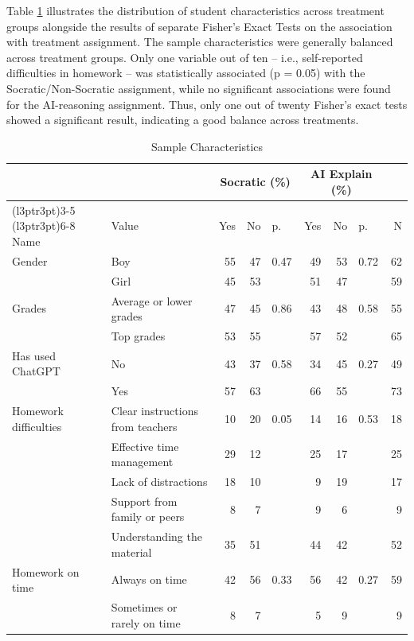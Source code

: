 \documentclass[
  11pt,
]{article}
\begin{document}
Table \ref{tab:summary-statistics} illustrates the distribution of student characteristics across treatment groups alongside the results of separate Fisher's Exact Tests on the association with treatment assignment. The sample characteristics were generally balanced across treatment groups. Only one variable out of ten -- i.e., self-reported difficulties in homework -- was statistically associated (p = 0.05) with the Socratic/Non-Socratic assignment, while no significant associations were found for the AI-reasoning assignment. Thus, only one out of twenty Fisher's exact tests showed a significant result, indicating a good balance across treatments.

\begin{table}
\centering
\caption{\label{tab:summary-statistics}Sample Characteristics}
\centering
\begin{tabular}[t]{llrrlrrlr}
\toprule
\multicolumn{2}{c}{ } & \multicolumn{3}{c}{Socratic (\%)} & \multicolumn{3}{c}{AI Explain (\%)} & \multicolumn{1}{c}{ } \\
\cmidrule(l{3pt}r{3pt}){3-5} \cmidrule(l{3pt}r{3pt}){6-8}
Name & Value & Yes & No & p. & Yes & No & p. & N\\
\midrule
Gender & Boy & 55 & 47 & 0.47 & 49 & 53 & 0.72 & 62\\
\hline
 & Girl & 45 & 53 &  & 51 & 47 &  & 59\\
\hline
Grades & Average or lower grades & 47 & 45 & 0.86 & 43 & 48 & 0.58 & 55\\
\hline
 & Top grades & 53 & 55 &  & 57 & 52 &  & 65\\
\hline
Has used ChatGPT & No & 43 & 37 & 0.58 & 34 & 45 & 0.27 & 49\\
\hline
 & Yes & 57 & 63 &  & 66 & 55 &  & 73\\
\hline
Homework difficulties & Clear instructions from teachers & 10 & 20 & 0.05 & 14 & 16 & 0.53 & 18\\
\hline
 & Effective time management & 29 & 12 &  & 25 & 17 &  & 25\\
\hline
 & Lack of distractions & 18 & 10 &  & 9 & 19 &  & 17\\
\hline
 & Support from family or peers & 8 & 7 &  & 9 & 6 &  & 9\\
\hline
 & Understanding the material & 35 & 51 &  & 44 & 42 &  & 52\\
\hline
Homework on time & Always on time & 42 & 56 & 0.33 & 56 & 42 & 0.27 & 59\\
\hline
 & Sometimes or rarely on time & 8 & 7 &  & 5 & 9 &  & 9\\

\end{tabular}
\end{table}
\end{document}
